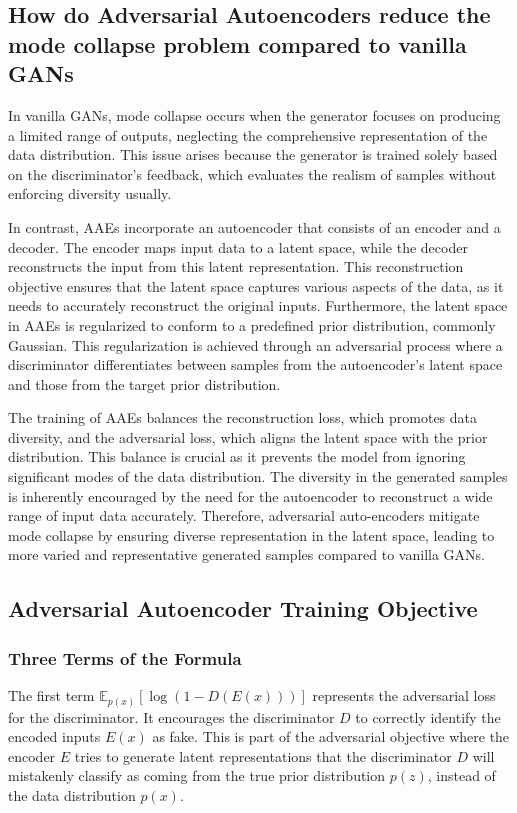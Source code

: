 \documentclass[a4paper]{article}
\begin{document}
\subsection{How do Adversarial Autoencoders reduce the mode collapse problem compared to vanilla GANs}
In vanilla GANs, mode collapse occurs when the generator focuses on producing a limited range of outputs, neglecting the
comprehensive representation of the data distribution. This issue arises because the generator is trained solely based on
the discriminator's feedback, which evaluates the realism of samples without enforcing diversity usually.

In contrast, AAEs incorporate an autoencoder that consists of an encoder and a decoder. The encoder maps input data to
a latent space, while the decoder reconstructs the input from this latent representation. This reconstruction objective
ensures that the latent space captures various aspects of the data, as it needs to accurately reconstruct the original
inputs. Furthermore, the latent space in AAEs is regularized to conform to a predefined prior distribution, commonly
Gaussian. This regularization is achieved through an adversarial process where a discriminator differentiates between
samples from the autoencoder's latent space and those from the target prior distribution.

The training of AAEs balances the reconstruction loss, which promotes data diversity, and the adversarial loss, which
aligns the latent space with the prior distribution. This balance is crucial as it prevents the model from ignoring
significant modes of the data distribution. The diversity in the generated samples is inherently encouraged by the need
for the autoencoder to reconstruct a wide range of input data accurately. Therefore, adversarial auto-encoders mitigate
mode collapse by ensuring diverse representation in the latent space, leading to more varied and representative generated
samples compared to vanilla GANs.

\subsection{Adversarial Autoencoder Training Objective}
\subsubsection{Three Terms of the Formula}
The first term $\mathbb{E}_{p(x)}[\log(1 - D(E(x)))]$ represents the adversarial loss for the discriminator. It
encourages the discriminator $D$ to correctly identify the encoded inputs $E(x)$ as fake. This is part of the
adversarial objective where the encoder $E$ tries to generate latent representations that the discriminator $D$ will
mistakenly classify as coming from the true prior distribution $p(z)$, instead of the data distribution $p(x)$.
\end{document}
